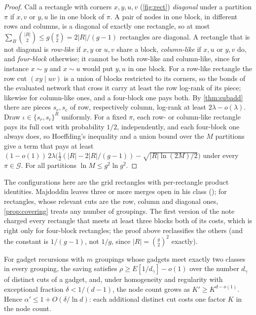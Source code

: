 \documentclass[10pt]{amsart}
\theoremstyle{plain}
\theoremstyle{definition}
\theoremstyle{remark}
\numberwithin{equation}{section}
\begin{document}
\begin{proof}
Call a rectangle with corners $x,y,u,v$ (\cref{fig:rect}) \emph{diagonal} under a partition $\pi$ if
$x,v$ or $y,u$ lie in one block of $\pi$. A pair of nodes in one block, in different rows and columns, is
a diagonal of exactly one rectangle, so at most $\sum_B\binom{|B|}2\le g\binom g2=2|R|/(g-1)$ rectangles
are diagonal. A rectangle that is not diagonal is \emph{row-like} if $x,y$ or $u,v$ share a block,
\emph{column-like} if $x,u$ or $y,v$ do, and \emph{four-block} otherwise; it cannot be both row-like
and column-like, since for instance $x\sim y$ and $x\sim u$ would put $y,u$ in one block. For a
row-like rectangle the row cut $(xy\mid uv)$ is a union of blocks restricted to its corners, so the bonds
of the evaluated network that cross it carry at least the row log-rank of its piece; likewise for
column-like ones, and a four-block one pays both. By \cref{thm:subadd} there are pieces $s_r,s_c$ of
row, respectively column, log-rank at least $2\lambda-o(\lambda)$. Draw $\iota\in\{s_r,s_c\}^R$
uniformly. For a fixed $\pi$, each row- or column-like rectangle pays its full cost with probability
$1/2$, independently, and each four-block one always does, so Hoeffding's inequality and a union bound
over the $M$ partitions give a term that pays at least
$(1-o(1))\,2\lambda\bigl(\tfrac12(|R|-2|R|/(g-1))-\sqrt{|R|\ln(2M)/2}\bigr)$ under every $\pi\in\mathcal G$.
For all partitions $\ln M\le g^2\ln g^2$.
\end{proof}

\noindent The configurations here are the grid rectangles with per-rectangle product identities.
Majdoddin leaves three or more merges open in his class (\cite[\S4.8 and Open Problem~4]{Maj26}); for
rectangles, whose relevant cuts are the row, column and diagonal ones, \cref{prop:covering} treats
any number of groupings. The first version of the note charged every rectangle that meets at least
three blocks both of its costs, which is right only for four-block rectangles; the proof above
reclassifies the others (and the constant is $1/(g-1)$, not $1/g$, since $|R|=\binom g2^2$ exactly).

\begin{proposition}\label{prop:multigroup}
For gadget recursions with $m$ groupings whose gadgets meet exactly two classes in every grouping, the
saving satisfies $\rho\ge E[1/d_\gamma]-o(1)$ over the number $d_\gamma$ of distinct cuts of a gadget,
and, under homogeneity and regularity with exceptional fraction $\delta<1/(d-1)$, the node count grows
as $K'\ge K^{d-o(1)}$. Hence $\alpha'\le1+O(\delta/\ln d)$: each additional distinct cut costs one factor
$K$ in the node count.
\end{proposition}
\end{document}
